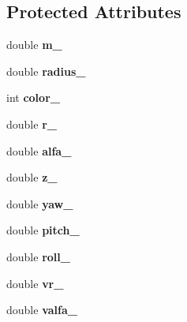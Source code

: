 \subsection*{Protected Attributes}
\begin{DoxyCompactItemize}
\item 
double {\bfseries m\+\_\+}\hypertarget{class_orb_af831efd6e6975007b7e7d49ce169eb1f}{}\label{class_orb_af831efd6e6975007b7e7d49ce169eb1f}

\item 
double {\bfseries radius\+\_\+}\hypertarget{class_orb_a8668fe8396d42e4eff952a0a340751cc}{}\label{class_orb_a8668fe8396d42e4eff952a0a340751cc}

\item 
int {\bfseries color\+\_\+}\hypertarget{class_orb_a711114d896e38b7627ddfc6c0ba0666a}{}\label{class_orb_a711114d896e38b7627ddfc6c0ba0666a}

\item 
double {\bfseries r\+\_\+}\hypertarget{class_orb_a6bda794dbd4c9f17b245cab3c287fe15}{}\label{class_orb_a6bda794dbd4c9f17b245cab3c287fe15}

\item 
double {\bfseries alfa\+\_\+}\hypertarget{class_orb_a15cdeb4a8dfd011ba311ccd3b95111bd}{}\label{class_orb_a15cdeb4a8dfd011ba311ccd3b95111bd}

\item 
double {\bfseries z\+\_\+}\hypertarget{class_orb_a3e83499b11c245a656f0fcbf6eb4c538}{}\label{class_orb_a3e83499b11c245a656f0fcbf6eb4c538}

\item 
double {\bfseries yaw\+\_\+}\hypertarget{class_orb_ab9d65b2a65d5a507edd440fe37171523}{}\label{class_orb_ab9d65b2a65d5a507edd440fe37171523}

\item 
double {\bfseries pitch\+\_\+}\hypertarget{class_orb_a06d9775e124b0cd6f7d3a70f4aafdb5a}{}\label{class_orb_a06d9775e124b0cd6f7d3a70f4aafdb5a}

\item 
double {\bfseries roll\+\_\+}\hypertarget{class_orb_a17b20eaacba3073347c91e63186c5acf}{}\label{class_orb_a17b20eaacba3073347c91e63186c5acf}

\item 
double {\bfseries vr\+\_\+}\hypertarget{class_orb_a92482a1423a5f50ad5cd88a0126c2261}{}\label{class_orb_a92482a1423a5f50ad5cd88a0126c2261}

\item 
double {\bfseries valfa\+\_\+}\hypertarget{class_orb_ad21a6b350baf08f2a0674f7f370abbed}{}\label{class_orb_ad21a6b350baf08f2a0674f7f370abbed}


\end{DoxyCompactItemize}
